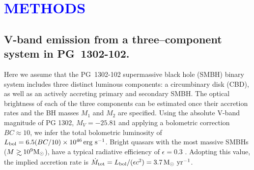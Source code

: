 %

\section*{\large\textcolor{blue}{METHODS}}
\subsection{V-band emission from a three--component system in PG~1302-102.}

Here we assume that the PG~1302-102 supermassive black hole (SMBH)
binary system includes three distinct luminous components: a
circumbinary disk (CBD), as well as an actively accreting primary and
secondary SMBH.  The optical brightness of each of the three
components can be estimated once their accretion rates and the BH
masses $M_1$ and $M_2$ are specified.  Using the absolute V-band
magnitude of PG 1302, $M_V = -25.81$ and applying a bolometric
correction $BC \approx 10$, \cite{RichardsQBCs:2006} we infer the
total bolometric luminosity of $L_{\rm bol}=6.5 (BC/10) \times
10^{46}\, {\rm erg~s^{-1}}$.  Bright quasars with the most massive
SMBHs ($M\gsim 10^9{\rm M_\odot}$), have a typical radiative
efficiency of $\epsilon=0.3$ \cite{YuTremaine2002}.  Adopting this value, the implied accretion
rate is $\dot{M}_{\rm tot} = L_{\rm{bol}}/(\epsilon c^2) = 3.7\, {\rm
  M_\odot~yr^{-1}}$.



